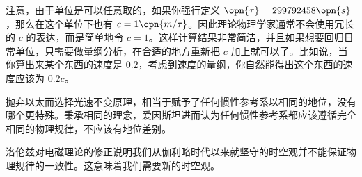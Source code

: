 注意，由于单位是可以任意取的，如果你强行定义 $\opn{\tau}=299792458\opn{s}$，那么在这个单位下也有 $c=1\opn{m/\tau}$。因此理论物理学家通常不会使用冗长的 $c$ 的表达，而是简单地令 $c=1$。这样计算结果非常简洁，并且如果想要回归日常单位，只需要做量纲分析，在合适的地方重新把 $c$ 加上就可以了。比如说，当你算出来某个东西的速度是 $0.2$，考虑到速度的量纲，你自然能得出这个东西的速度应该为 $0.2c$。

抛弃以太而选择光速不变原理，相当于赋予了任何惯性参考系以相同的地位，没有哪个更特殊。秉承相同的理念，爱因斯坦进而认为任何惯性参考系都应该遵循完全相同的物理规律，不应该有地位差别。

洛伦兹对电磁理论的修正说明我们从伽利略时代以来就坚守的时空观并不能保证物理规律的一致性。这意味着我们需要新的时空观。




